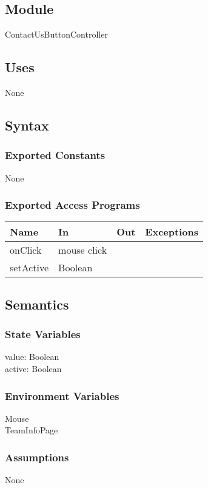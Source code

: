 \documentclass[12pt, titlepage]{article}
\begin{document}
\subsection{Module}

ContactUsButtonController

\subsection{Uses}
None
\subsection{Syntax}
\subsubsection{Exported Constants}
None
\subsubsection{Exported Access Programs}
\begin{center}
\begin{tabular}{|l|l|l|p{5cm}|}
\hline
\textbf{Name} & \textbf{In} & \textbf{Out} & \textbf{Exceptions} \\
\hline
onClick & mouse click & & \\
\hline
setActive & Boolean &  &  \\
\hline
\end{tabular}
\end{center}

\subsection{Semantics}

\subsubsection{State Variables}
value: Boolean\\
active: Boolean
\subsubsection{Environment Variables}

Mouse\\
TeamInfoPage

\subsubsection{Assumptions}
None
\end{document}
